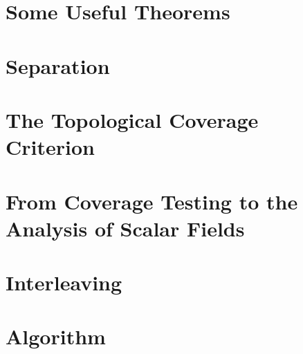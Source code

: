 \documentclass[12pt]{article}
\begin{document}

\section{Some Useful Theorems}


\section{Separation}


\clearpage
\section{The Topological Coverage Criterion}


\clearpage
\section{From Coverage Testing to the Analysis of Scalar Fields}

%
\clearpage
\section{Interleaving}


\clearpage
\section{Algorithm}

%
%
% 
%
% 
\end{document}
